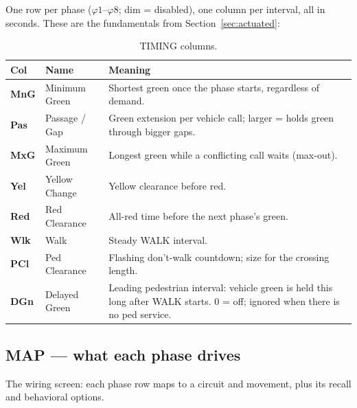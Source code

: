 \documentclass[11pt]{article}
\newcommand{\ph}[1]{\ensuremath{\varphi#1}}
\newcommand{\field}[1]{\textsf{\textbf{#1}}}
\newcommand{\screen}[1]{\textsc{#1}}
\begin{document}
One row per phase (\ph{1}–\ph{8}; dim = disabled), one column per interval, all in
seconds. These are the fundamentals from Section~\ref{sec:actuated}:

\begin{table}[H]
\centering\small
\begin{tabular}{@{}llp{9.2cm}@{}}
\toprule
\textbf{Col} & \textbf{Name} & \textbf{Meaning} \\
\midrule
\field{MnG} & Minimum Green   & Shortest green once the phase starts, regardless of demand. \\
\field{Pas} & Passage / Gap   & Green extension per vehicle call; larger = holds green through bigger gaps. \\
\field{MxG} & Maximum Green   & Longest green while a conflicting call waits (max-out). \\
\field{Yel} & Yellow Change   & Yellow clearance before red. \\
\field{Red} & Red Clearance   & All-red time before the next phase's green. \\
\field{Wlk} & Walk            & Steady WALK interval. \\
\field{PCl} & Ped Clearance   & Flashing don't-walk countdown; size for the crossing length. \\
\field{DGn} & Delayed Green   & Leading pedestrian interval: vehicle green is held this long
                                after WALK starts. 0 = off; ignored when there is no ped service. \\
\bottomrule
\end{tabular}
\caption{\screen{TIMING} columns.}
\label{tab:timing}
\end{table}

\subsection{MAP — what each phase drives}\label{sec:map}

The wiring screen: each phase row maps to a circuit and movement, plus its recall
and behavioral options.
\end{document}
